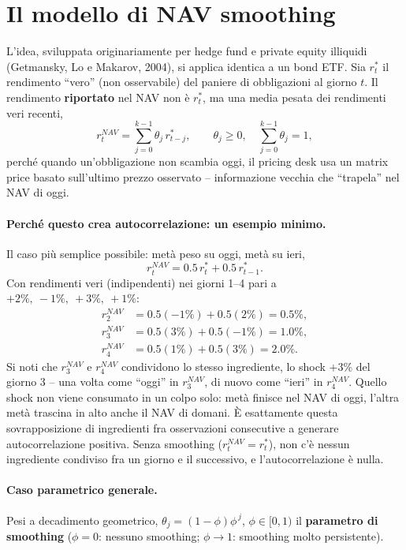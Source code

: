 \documentclass[11pt]{article}
\begin{document}
\section{Il modello di NAV smoothing}
\label{sec:model}

L'idea, sviluppata originariamente per hedge fund e private equity illiquidi (Getmansky, Lo e Makarov, 2004), si applica identica a un bond ETF. Sia $r^\ast_t$ il rendimento ``vero'' (non osservabile) del paniere di obbligazioni al giorno $t$. Il rendimento \textbf{riportato} nel NAV non \`e $r^\ast_t$, ma una media pesata dei rendimenti veri recenti,
\[
r^{NAV}_t = \sum_{j=0}^{k-1} \theta_j\, r^\ast_{t-j}, \qquad \theta_j \ge 0,\quad \sum_{j=0}^{k-1}\theta_j = 1,
\]
perch\'e quando un'obbligazione non scambia oggi, il pricing desk usa un matrix price basato sull'ultimo prezzo osservato -- informazione vecchia che ``trapela'' nel NAV di oggi.

\paragraph{Perch\'e questo crea autocorrelazione: un esempio minimo.} Il caso pi\`u semplice possibile: met\`a peso su oggi, met\`a su ieri,
\[
r^{NAV}_t = 0.5\, r^\ast_t + 0.5\, r^\ast_{t-1}.
\]
Con rendimenti veri (indipendenti) nei giorni 1--4 pari a $+2\%,\ -1\%,\ +3\%,\ +1\%$:
\begin{align*}
r^{NAV}_2 &= 0.5(-1\%)+0.5(2\%) = 0.5\%, \\
r^{NAV}_3 &= 0.5(3\%)+0.5(-1\%) = 1.0\%, \\
r^{NAV}_4 &= 0.5(1\%)+0.5(3\%) = 2.0\%.
\end{align*}
Si noti che $r^{NAV}_3$ e $r^{NAV}_4$ condividono lo stesso ingrediente, lo shock $+3\%$ del giorno 3 -- una volta come ``oggi'' in $r^{NAV}_3$, di nuovo come ``ieri'' in $r^{NAV}_4$. Quello shock non viene consumato in un colpo solo: met\`a finisce nel NAV di oggi, l'altra met\`a trascina in alto anche il NAV di domani. \`E esattamente questa sovrapposizione di ingredienti fra osservazioni consecutive a generare autocorrelazione positiva. Senza smoothing ($r^{NAV}_t = r^\ast_t$), non c'\`e nessun ingrediente condiviso fra un giorno e il successivo, e l'autocorrelazione \`e nulla.

\paragraph{Caso parametrico generale.} Pesi a decadimento geometrico, $\theta_j = (1-\phi)\phi^{\,j}$, $\phi\in[0,1)$ il \textbf{parametro di smoothing} ($\phi=0$: nessuno smoothing; $\phi\to 1$: smoothing molto persistente).
\end{document}
